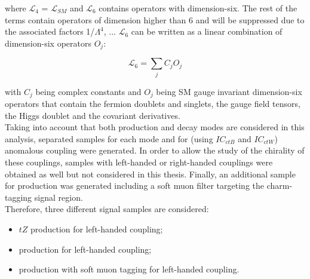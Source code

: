 \noindent where $\mathcal{L}_4$ = $\mathcal{L}_{SM}$ and $\mathcal{L}_6$ contains operators with dimension-six. The rest of the terms contain operators of dimension higher than 6 and will be suppressed due to the associated factors 1/$\Lambda^4$, ... $\mathcal{L}_6$ can be written as a linear combination of dimension-six operators $O_j$: 

\begin{equation}
\mathcal{L}_6 = \sum_j C_j O_j
\end{equation}

\noindent with $C_j$ being complex constants and $O_j$ being SM gauge invariant dimension-six operators that contain the fermion doublets and singlets, the gauge field tensors, the Higgs doublet and the covariant derivatives.\\
Taking into account that both production and decay modes are considered in this analysis, separated samples for each mode and for \tZc (using $IC_{ctB}$ and $IC_{ctW}$) anomalous coupling were generated. In order to allow the study of the chirality of these couplings, samples with left-handed or right-handed couplings were obtained as well but not considered in this thesis. Finally, an additional sample for \ttbar production was generated including a soft muon filter targeting the charm-tagging signal region. \\
Therefore, three different signal samples are considered:
\begin{itemize}
	\item $tZ$ production for \tZc left-handed coupling; 
	\item \ttbar production for \tZc left-handed coupling; 
	\item \ttbar production with soft muon tagging for \tZc left-handed coupling. 
\end{itemize}

